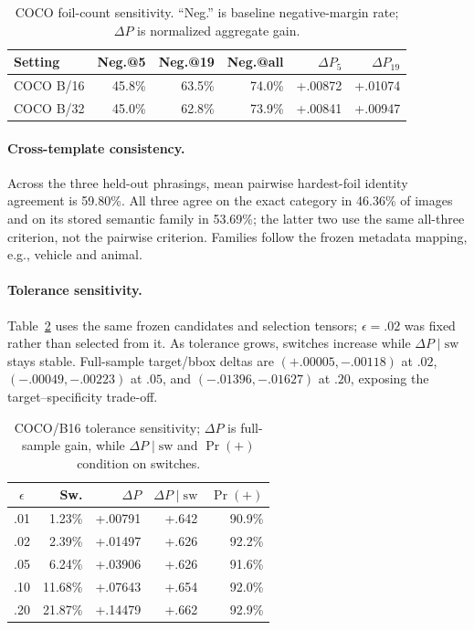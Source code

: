 \documentclass[10pt]{article}
\begin{document}
\begin{table}[!t]
\centering
\caption{COCO foil-count sensitivity. ``Neg.'' is baseline negative-margin rate; $\Delta P$ is normalized aggregate gain.}
\label{tab:foilcount}
\small
\setlength{\tabcolsep}{2.1pt}
\renewcommand{\arraystretch}{1.04}
\begin{tabular*}{\columnwidth}{@{\extracolsep{\fill}}lrrrrr@{}}
\toprule
Setting & Neg.@5 & Neg.@19 & Neg.@all & $\Delta P_5$ & $\Delta P_{19}$\\
\midrule
COCO B/16 & 45.8\% & 63.5\% & 74.0\% & +.00872 & +.01074\\
COCO B/32 & 45.0\% & 62.8\% & 73.9\% & +.00841 & +.00947\\
\bottomrule
\end{tabular*}
\end{table}

\paragraph{Cross-template consistency.}
Across the three held-out phrasings, mean pairwise hardest-foil identity agreement is
59.80\%. All three agree on the exact category in 46.36\% of images and on its
stored semantic family in 53.69\%; the latter two
use the same all-three criterion, not the pairwise criterion.
Families follow the frozen metadata mapping, e.g., vehicle and animal.


\paragraph{Tolerance sensitivity.}
Table~\ref{tab:frontier} uses the same frozen candidates and selection tensors;
$\epsilon=.02$ was fixed rather than selected from it. As tolerance grows, switches
increase while $\Delta P\mid\mathrm{sw}$ stays stable. Full-sample target/bbox deltas
are $(+.00005,-.00118)$ at $.02$, $(-.00049,-.00223)$ at $.05$, and
$(-.01396,-.01627)$ at $.20$, exposing the target--specificity trade-off.

\begin{table}[!t]
\centering
\caption{COCO/B16 tolerance sensitivity; $\Delta P$ is full-sample gain, while $\Delta P\mid\mathrm{sw}$ and $\Pr(+)$ condition on switches.}
\label{tab:frontier}
\small
\setlength{\tabcolsep}{2.0pt}
\renewcommand{\arraystretch}{1.04}
\begin{tabular*}{\columnwidth}{@{\extracolsep{\fill}}crrrr@{}}
\toprule
$\epsilon$ & Sw. & $\Delta P$ & $\Delta P\mid\mathrm{sw}$ & $\Pr(+)$\\
\midrule
.01 & 1.23\% & +.00791 & +.642 & 90.9\%\\
.02 & 2.39\% & +.01497 & +.626 & 92.2\%\\
.05 & 6.24\% & +.03906 & +.626 & 91.6\%\\
.10 & 11.68\% & +.07643 & +.654 & 92.0\%\\
.20 & 21.87\% & +.14479 & +.662 & 92.9\%\\
\bottomrule
\end{tabular*}
\end{table}
\end{document}
